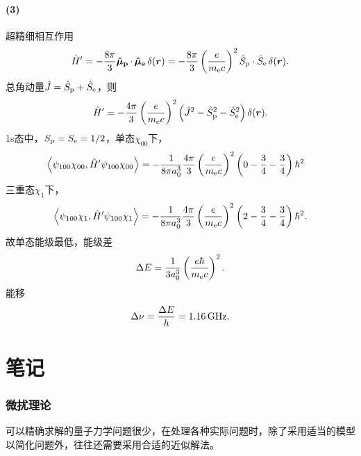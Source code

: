 	\subsection*{(3)}
	超精细相互作用
	\begin{align}
		\hat H'=-\frac{8\pi}3\bm{\hat \mu_\mathrm p}\!\mathop{}\cdot\,\bm{\hat \mu_\mathrm e}\!\mathop{}\mathop{}\!\delta(\bm r)=-\frac{8\pi}3\left(\frac e{m_\mathrm e c}\right)^2\hat S_\mathrm p\cdot\hat S_\mathrm e\mathop{}\!\delta(\bm r).
	\end{align}
	总角动量$\hat J=\hat S_\mathrm p+\hat S_\mathrm e$，则
	\begin{align}
		\hat H'=-\frac{4\pi}3\left(\frac e{m_\mathrm e c}\right)^2\left(\hat J^2-\hat S_\mathrm p^2-\hat S_\mathrm e^2\right)\mathop{}\!\delta(\bm r).
	\end{align}
	1s态中，$S_\mathrm p=S_\mathrm e=1/2$，单态$\chi_{00}$下，
	\begin{align}
		\left\langle \psi_{100}\chi_{00},\hat H'\psi_{100}\chi_{00}\right\rangle&=-\frac1{8\pi a_0^3}\frac{4\pi}3\left(\frac e{m_\mathrm e c}\right)^2\left(0-\frac34-\frac34\right)\hbar^2
	\end{align}
	三重态$\chi_1$下，
	\begin{align}
		\left\langle \psi_{100}\chi_1,\hat H'\psi_{100}\chi_1\right\rangle=-\frac1{8\pi a_0^3}\frac{4\pi}3\left(\frac e{m_\mathrm e c}\right)^2\left(2-\frac34-\frac34\right)\hbar^2.
	\end{align}
	故单态能级最低，能级差
	\begin{align}
		\Delta E=\frac1{3a_0^3}\left(\frac{e\hbar}{m_\mathrm e c}\right)^2.
	\end{align}
	能移
	\begin{align}
		\D\nu=\frac{\D E}h=\SI{1.16}\GHz.
	\end{align}
	\clearpage
	\part{笔记}
	\section{微扰理论}
可以精确求解的量子力学问题很少，在处理各种实际问题时，除了采用适当的模型以简化问题外，往往还需要采用合适的近似解法。
